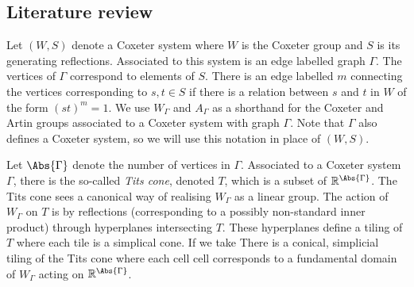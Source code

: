 \subsection{Literature review}
Let $(W,S)$ denote a Coxeter system where $W$ is the Coxeter group and $S$ is its generating reflections.
Associated to this system is an edge labelled graph $\Gamma$.
The vertices of  $\Gamma$ correspond to elements of  $S$.
There is an edge labelled $m$ connecting the vertices corresponding to $s,t\in S$ if there is a relation between $s$ and  $t$ in  $W$ of the form  $(st)^m=1$.
We use $W_\Gamma$ and  $A_\Gamma$  as a shorthand for the Coxeter and Artin groups associated to a Coxeter system with graph $\Gamma$.
Note that $\Gamma$ also defines a Coxeter system, so we will use this notation in place of $(W,S)$.

Let $\Abs{\Gamma}$ denote the number of vertices in $\Gamma$.
Associated to a Coxeter system $\Gamma$, there is the so-called \emph{Tits cone}, denoted $T$, which is a subset of $\R^\Abs{\Gamma}$.
The Tits cone sees a canonical way of realising $W_\Gamma$ as a linear group.
The action of $W_\Gamma$ on  $T$ is by reflections (corresponding to a possibly non-standard inner product) through hyperplanes intersecting $T$.
These hyperplanes define a tiling of  $T$ where each tile is a simplical cone.
If we take
There is a conical, simplicial tiling of the Tits cone where each cell  cell corresponds to a fundamental domain of  $W_\Gamma$ acting on  $\R^\Abs{\Gamma}$.

